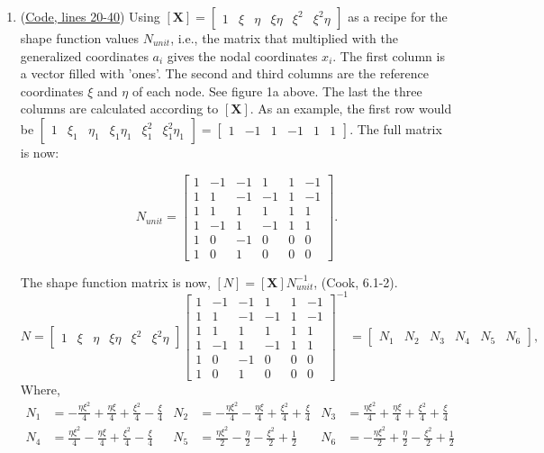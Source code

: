 \documentclass{article}
\begin{document}
\begin{enumerate}
	\item (\hyperref[code1]{Code, lines 20-40}) Using  $[\boldsymbol{X}]=\begin{bmatrix}1 & \xi & \eta & \xi\eta & \xi^2 & \xi^2\eta\end{bmatrix}$ as a recipe for the shape function values $N_{unit}$, i.e., the matrix that multiplied with the generalized coordinates $a_i$ gives the nodal coordinates $x_i$. The first column is a vector filled with 'ones'. The second and third columns are the reference coordinates $\xi$ and $\eta$ of each node. See figure 1a above. The last the three columns are calculated according to  $[\boldsymbol{X}]$. As an example, the first row would be $\begin{bmatrix}1 & \xi_1 & \eta_1 & \xi_1\eta_1 & \xi_1^2 & \xi_1^2\eta_1\end{bmatrix} = \begin{bmatrix}1 & -1 & 1 & -1 & 1 & 1\end{bmatrix}$. The full matrix is now: 

	\[N_{unit} = 
	\begin{bmatrix}
		1 & -1 & -1 & 1 & 1 & -1\\
		1 & 1 & -1 & -1 & 1 & -1\\
		1 & 1 & 1 & 1 & 1 & 1\\
		1 & -1 & 1 & -1 & 1 & 1\\
		1 & 0 & -1 & 0 & 0 & 0\\
		1 & 0 & 1 & 0 & 0 & 0
	\end{bmatrix}
	.\] 	

	The shape function matrix is now, $[N] = [\boldsymbol{X}] N_{unit}^{-1}$, (Cook, 6.1-2). 
	\[N = \begin{bmatrix}1 & \xi & \eta & \xi\eta & \xi^2 & \xi^2\eta\end{bmatrix}
	\begin{bmatrix}
		1 & -1 & -1 & 1 & 1 & -1\\
		1 & 1 & -1 & -1 & 1 & -1\\
		1 & 1 & 1 & 1 & 1 & 1\\
		1 & -1 & 1 & -1 & 1 & 1\\
		1 & 0 & -1 & 0 & 0 & 0\\
		1 & 0 & 1 & 0 & 0 & 0
	\end{bmatrix}^{-1}
	= \begin{bmatrix}N_1 & N_2 & N_3 & N_4 & N_5 & N_6 \end{bmatrix}, 
	\]
	Where, 
	\begin{align*}
		N_1 &= 
		- \frac{\eta \xi^{2}}{4} + \frac{\eta \xi}{4} + \frac{\xi^{2}}{4} - \frac{\xi}{4} &
		N_2 &= 
		- \frac{\eta \xi^{2}}{4} - \frac{\eta \xi}{4} + \frac{\xi^{2}}{4} + \frac{\xi}{4} &
		N_3 &= 
\frac{\eta \xi^{2}}{4} + \frac{\eta \xi}{4} + \frac{\xi^{2}}{4} + \frac{\xi}{4} \\
		N_4 &= 
		\frac{\eta \xi^{2}}{4} - \frac{\eta \xi}{4} + \frac{\xi^{2}}{4} - \frac{\xi}{4} &
		N_5 &= 
		\frac{\eta \xi^{2}}{2} - \frac{\eta}{2} - \frac{\xi^{2}}{2} + \frac{1}{2} &
		N_6 &= 
- \frac{\eta \xi^{2}}{2} + \frac{\eta}{2} - \frac{\xi^{2}}{2} + \frac{1}{2}
	\end{align*}


\end{enumerate}
\end{document}

